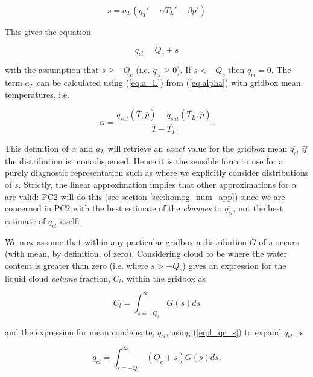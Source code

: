 \documentclass{UMDP_article}
\begin{document}
\begin{equation}
s = a_L \left(  {q_T}' - \alpha {T_L}' - \beta {p}' \right)
\label{eq:s}
\end{equation}

This gives the equation

\begin{equation}
q_{cl} = Q_c + s
\label{eq:l_qc_s}
\end{equation}

with the assumption that $s \ge -Q_c$ (i.e. $q_{cl} \ge 0$).
If $s < -Q_c$ then $q_{cl} = 0$. The term $a_L$ can be calculated
using (\ref{eq:a_L})
from (\ref{eq:alpha}) with gridbox mean temperatures, i.e. 

\begin{equation}
\alpha = \frac{ q_{sat}(\overline{T},\overline{p})
- q_{sat}(\overline{T_L},\overline{p}) }{\overline{T} -
\overline{T_L} } .
\label{eq:alpha_mean}
\end{equation}

This definition of $\alpha$ and $a_L$ will retrieve an \textit{exact} value for
the gridbox mean $\overline{q_{cl}}$ \textit{if}
the distribution is monodispersed. Hence it is the sensible form to use for a
purely diagnostic representation such as \cite{smith90} where we explicitly
consider distributions of $s$. Strictly, the linear approximation
implies that other
approximations for $\alpha$ are valid: PC2 will do this
(see section \ref{sec:homog_num_app}) since we are concerned in PC2 with
the best estimate of the \textit{changes} to $\overline{q_{cl}}$, not the best
estimate of $\overline{q_{cl}}$ itself.

We now assume that within
any particular gridbox a distribution $G$ of $s$ occurs (with mean, by
definition, of zero). Considering cloud to be where the water content
is greater than zero (i.e. where $s > -Q_c$) gives an expression for the
liquid cloud \textit{volume} fraction, $C_l$, within the gridbox as

\begin{equation}
C_l = \int_{s=-Q_c}^{\infty} G(s) ds
\label{eq:int_gs_ds}
\end{equation}

and the expression for mean condensate, ${\overline{q_{cl}}}$, using
(\ref{eq:l_qc_s}) to expand $q_{cl}$, is

\begin{equation}
\overline{q_{cl}} = \int_{s=-Q_c}^{\infty} (Q_c + s) G(s) ds .
\label{eq:qclbar=int}
\end{equation}
\end{document}
